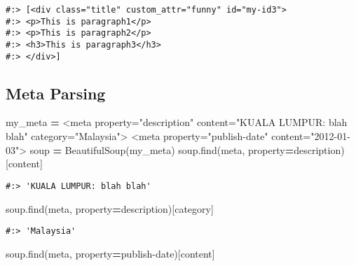 \documentclass[
]{book}
\newenvironment{Shaded}{\begin{snugshade}}{\end{snugshade}}
\newcommand{\BuiltInTok}[1]{#1}
\newcommand{\NormalTok}[1]{#1}
\newcommand{\OperatorTok}[1]{\textcolor[rgb]{0.43,0.43,0.43}{\textbf{#1}}}
\newcommand{\StringTok}[1]{\textcolor[rgb]{0.5,0.5,0.5}{#1}}
\begin{document}
\begin{verbatim}
#:> [<div class="title" custom_attr="funny" id="my-id3">
#:> <p>This is paragraph1</p>
#:> <p>This is paragraph2</p>
#:> <h3>This is paragraph3</h3>
#:> </div>]
\end{verbatim}

\hypertarget{meta-parsing}{%
\subsection{Meta Parsing}\label{meta-parsing}}

\begin{Shaded}
\begin{Highlighting}[]
\NormalTok{my\_meta }\OperatorTok{=} \StringTok{\textquotesingle{}\textquotesingle{}\textquotesingle{}}
\StringTok{\textless{}meta property="description"   content="KUALA LUMPUR: blah blah"   category="Malaysia"\textgreater{}}
\StringTok{\textless{}meta property="publish{-}date"  content="2012{-}01{-}03"\textgreater{}}
\StringTok{\textquotesingle{}\textquotesingle{}\textquotesingle{}}
\NormalTok{soup }\OperatorTok{=}\NormalTok{ BeautifulSoup(my\_meta)}
\NormalTok{soup.find(}\StringTok{\textquotesingle{}meta\textquotesingle{}}\NormalTok{, }\BuiltInTok{property}\OperatorTok{=}\StringTok{\textquotesingle{}description\textquotesingle{}}\NormalTok{)[}\StringTok{\textquotesingle{}content\textquotesingle{}}\NormalTok{]}
\end{Highlighting}
\end{Shaded}

\begin{verbatim}
#:> 'KUALA LUMPUR: blah blah'
\end{verbatim}

\begin{Shaded}
\begin{Highlighting}[]
\NormalTok{soup.find(}\StringTok{\textquotesingle{}meta\textquotesingle{}}\NormalTok{, }\BuiltInTok{property}\OperatorTok{=}\StringTok{\textquotesingle{}description\textquotesingle{}}\NormalTok{)[}\StringTok{\textquotesingle{}category\textquotesingle{}}\NormalTok{]}
\end{Highlighting}
\end{Shaded}

\begin{verbatim}
#:> 'Malaysia'
\end{verbatim}

\begin{Shaded}
\begin{Highlighting}[]
\NormalTok{soup.find(}\StringTok{\textquotesingle{}meta\textquotesingle{}}\NormalTok{, }\BuiltInTok{property}\OperatorTok{=}\StringTok{\textquotesingle{}publish{-}date\textquotesingle{}}\NormalTok{)[}\StringTok{\textquotesingle{}content\textquotesingle{}}\NormalTok{]}
\end{Highlighting}
\end{Shaded}
\end{document}
